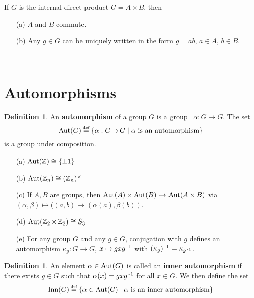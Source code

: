 \documentclass[11pt]{book}
\theoremstyle{definition}   \newtheorem{defn}[counter]{Definition} %
\newcommand\myeq{\mathrel{\overset{\makebox[0pt]{\mbox{\normalfont\tiny\sffamily \textrm{def}}}}{=}}}
\newcommand{\inn}{\textnormal{Inn}}   \newcommand{\out}{\textnormal{Out}}   \newcommand{\car}{\textnormal{ char }}   \newcommand{\id}{\textnormal{id}}   \newcommand{\triv}{\{e\}}
\DeclareMathOperator{\ra}{\rightarrow}   \DeclareMathOperator{\Poly}{\mathbf{P}}   \DeclareMathOperator{\spn}{\textnormal{span}}   \DeclareMathOperator{\aut}{\textnormal{Aut}}
\newcommand{\vs}{\vspace{8pt}}
\numberwithin{counter}{chapter}
\begin{document}
\vs

\begin{corollary}
If $G$ is the internal direct product $G = A \times B$, then
	\begin{enumerate}
	\item[(a)] $A$ and $B$ commute.
	\item[(b)] Any $g \in G$ can be uniquely written in the form $g = ab$, $a \in A$, $b \in B$.
	\end{enumerate}
\end{corollary}

\ \\

\section*{Automorphisms}

\vs

\begin{defn}
An \textbf{automorphism} of a group $G$ is a group \iso \ $\alpha : G \ra G$. The set
	\[\aut (G) \myeq \{\alpha : G \ra G \mid \alpha \tn{ is an automorphism} \} \]
is a group under composition.
\end{defn}

\vs
\begin{example}
\begin{enumerate}\
\item[(a)] $\aut(\z) \cong \{\pm 1\}$
\item[(b)] $\aut(\z_n) \cong (\z_n)\x$
\item[(c)] If $A,B$ are groups, then $\aut(A) \times \aut(B) \hookrightarrow \aut(A \times B)$ via $(\alpha, \beta) \mapsto ((a,b) \mapsto (\alpha(a),\beta(b))$.
\item[(d)] $\aut(\z_2\times \z_2) \cong S_3$
\item[(e)] For any group $G$ and any $g \in G$, conjugation with $g$ defines an automorphism $\kappa_g : G \ra G$, $x \mapsto gxg\operatorname{^{-1}}$ with $(\kappa_g)\operatorname{^{-1}} = \kappa_{g\operatorname{^{-1}}}$.
\end{enumerate}
\end{example}

\vs

\begin{defn}
An element $\alpha \in \aut(G)$ is called an \textbf{inner automorphism} if there exists $g \in G$ such that $\alpha(x) = gxg\operatorname{^{-1}}$ for all $x \in G$. We then define the set
	\[\inn(G) \myeq \{\alpha \in \aut(G) \mid \alpha \tn{ is an inner \auto} \} \]
\end{defn}
\end{document}
